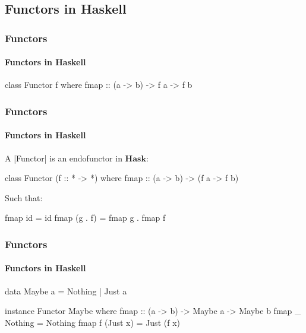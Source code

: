 \documentclass{beamer}
\newcommand{\catbf}[1]{\ensuremath{\mathbf{#1}}\xspace}
\newcommand{\hask}{\catbf{Hask}}
\begin{document}
\subsection{Functors in Haskell}


\begin{frame}[fragile]
  \frametitle{Functors}
  \framesubtitle{Functors in Haskell}

  \begin{definition}
    \begin{code}
class Functor f where
  fmap :: (a -> b) -> f a -> f b
    \end{code}
  \end{definition}

\end{frame}


\begin{frame}[fragile]
  \frametitle{Functors}
  \framesubtitle{Functors in Haskell}

  \begin{definition}
    A |Functor| is an endofunctor in \hask:
    \begin{code}
class Functor (f :: * -> *) where
  fmap :: (a -> b) -> (f a -> f b)
    \end{code}
    Such that:
    \begin{code}
fmap id      = id
fmap (g . f) = fmap g . fmap f
    \end{code}
  \end{definition}

\end{frame}


\begin{frame}[fragile]
  \frametitle{Functors}
  \framesubtitle{Functors in Haskell}

  \begin{example}
    \begin{code}
data Maybe a = Nothing | Just a

instance Functor Maybe where
  fmap :: (a -> b) -> Maybe a -> Maybe b
  fmap _ Nothing  = Nothing
  fmap f (Just x) = Just (f x)
    \end{code}
  \end{example}

\end{frame}
\end{document}

